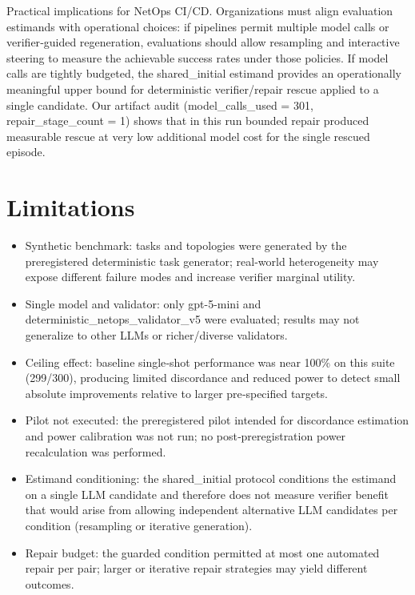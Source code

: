 \documentclass[conference]{IEEEtran}
\begin{document}
Practical implications for NetOps CI/CD. Organizations must align evaluation estimands with operational choices: if pipelines permit multiple model calls or verifier‑guided regeneration, evaluations should allow resampling and interactive steering to measure the achievable success rates under those policies. If model calls are tightly budgeted, the shared\_initial estimand provides an operationally meaningful upper bound for deterministic verifier/repair rescue applied to a single candidate. Our artifact audit (model\_calls\_used = 301, repair\_stage\_count = 1) shows that in this run bounded repair produced measurable rescue at very low additional model cost for the single rescued episode.

\section{Limitations}
\begin{itemize}
\item Synthetic benchmark: tasks and topologies were generated by the preregistered deterministic task generator; real‑world heterogeneity may expose different failure modes and increase verifier marginal utility.
\item Single model and validator: only gpt-5-mini and deterministic\_netops\_validator\_v5 were evaluated; results may not generalize to other LLMs or richer/diverse validators.
\item Ceiling effect: baseline single‑shot performance was near 100\% on this suite (299/300), producing limited discordance and reduced power to detect small absolute improvements relative to larger pre‑specified targets.
\item Pilot not executed: the preregistered pilot intended for discordance estimation and power calibration was not run; no post‑preregistration power recalculation was performed.
\item Estimand conditioning: the shared\_initial protocol conditions the estimand on a single LLM candidate and therefore does not measure verifier benefit that would arise from allowing independent alternative LLM candidates per condition (resampling or iterative generation).
\item Repair budget: the guarded condition permitted at most one automated repair per pair; larger or iterative repair strategies may yield different outcomes.
\end{itemize}
\end{document}
